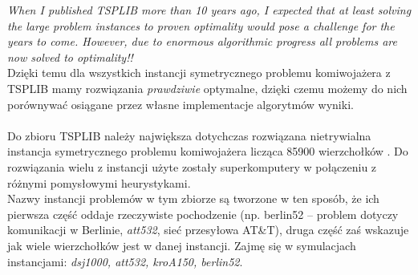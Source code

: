 \documentclass[a4paper]{article}
\theoremstyle{defn}
\theoremstyle{theorem}
\theoremstyle{lemma}
\theoremstyle{cor}
\theoremstyle{fact}
\begin{document}
\textit{When I published TSPLIB more than 10 years ago, I expected that at least solving the large problem instances to proven optimality would pose a challenge for the years to come.
However, due to enormous algorithmic progress all problems are now solved to optimality!!}
\\
Dzięki temu dla wszystkich instancji symetrycznego problemu komiwojażera z TSPLIB mamy rozwiązania \textit{prawdziwie} optymalne, dzięki czemu możemy do nich porównywać osiągane przez własne implementacje algorytmów wyniki.\\\\
Do zbioru TSPLIB należy największa dotychczas rozwiązana nietrywialna instancja symetrycznego problemu komiwojażera licząca 85900 wierzchołków \cite{85900}. Do rozwiązania wielu z instancji użyte zostały superkomputery w połączeniu z różnymi pomysłowymi heurystykami.\\

Nazwy instancji problemów w tym zbiorze są tworzone w ten sposób, że ich pierwsza część oddaje rzeczywiste pochodzenie (np. berlin52 – problem dotyczy komunikacji w Berlinie, \textit{att532}, sieć przesyłowa AT\&T), druga część zaś wskazuje jak wiele wierzchołków jest w danej instancji. Zajmę się w symulacjach instancjami: \textit{dsj1000, att532, kroA150, berlin52}.
\end{document}
